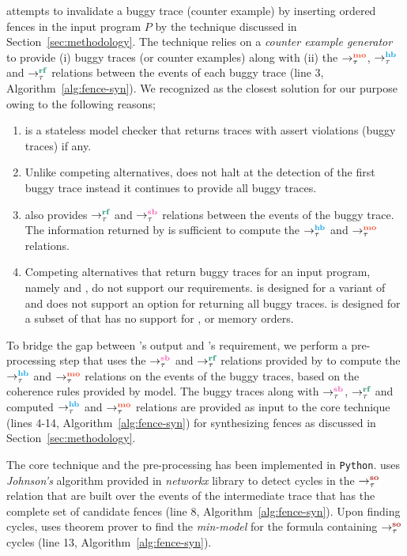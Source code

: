\ourtechnique attempts to invalidate a buggy trace (\aka counter
example) by inserting \sc ordered fences in the input program $P$
by the technique discussed in Section~\ref{sec:methodology}.
%
The technique relies on a {\em counter example generator} to provide
(i) buggy traces (or counter examples) along with (ii)
the $\setMO$, $\setHB$ and $\setRF$ relations between the events of 
each buggy trace (line 3, Algorithm~\ref{alg:fence-syn}).
%
We recognized \cds \cite{cds} as the closest solution for our purpose
owing to the following reasons;

\begin{enumerate}
	\item \cds is a stateless model checker that returns traces 
		with assert violations (\aka buggy traces) if any.
	
	\item Unlike competing alternatives, \cds does not halt at the detection 
		of the first buggy trace instead it continues to provide all buggy 
		traces.
	
	\item \cds also provides $\setRF$ and $\setSB$ relations between the events 
		of the buggy trace. The information returned by \cds is sufficient
		to compute the $\setHB$ and $\setMO$ relations.
	
	\item Competing alternatives that return buggy traces for an input
		program, namely \genmc \cite{genmc-PLDI19} and \tracer \cite{tracer2018}, 
		do not support our requirements.
		\genmc is designed for a variant of \cc \cite{LahavVafeiadis-PLDI17} and
		does not support an option for returning all buggy traces. \tracer is
		designed for a subset of \cc that has no support for \sc, \na or \rel 
		memory orders. 
\end{enumerate}

To bridge the gap between \cds's output and \ourtechnique's requirement,
we perform a pre-processing step that uses the $\setSB$ and $\setRF$ relations 
provided by \cds to compute the $\setHB$ and $\setMO$ relations on the events
of the buggy traces, based on the coherence rules provided by \cc model.
%
The buggy traces along with $\setSB$, $\setRF$ and computed $\setHB$ 
and $\setMO$ relations are provided as input to the core technique 
(lines 4-14, Algorithm~\ref{alg:fence-syn}) for synthesizing fences as
discussed in Section~\ref{sec:methodology}.

The core technique and the pre-processing has been implemented in 
{\tt Python}.
\ourtechnique uses {\em Johnson's} algorithm provided in {\em networkx}
library to detect cycles in the $\setSO$ relation that are built over the \sc
events of the intermediate trace that has the complete set 
of candidate fences (line 8, Algorithm~\ref{alg:fence-syn}).
%
Upon finding cycles, \ourtechnique uses \z theorem prover to find the 
{\em min-model} for the formula containing $\setSO$ cycles (line 13, 
Algorithm~\ref{alg:fence-syn}).

